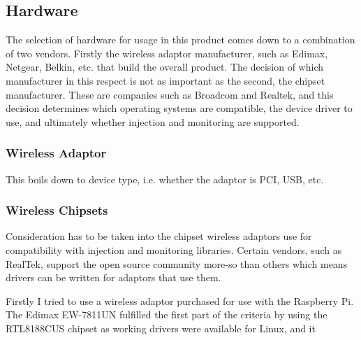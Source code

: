 \subsection{Hardware}
The selection of hardware for usage in this product comes down to a combination of two vendors. Firstly the wireless adaptor manufacturer, such as Edimax, Netgear, Belkin, etc. that build the overall product. The decision of which manufacturer in this respect is not as important as the second, the chipset manufacturer.  These are companies such as Broadcom and Realtek, and this decision determines which operating systems are compatible, the device driver to use, and ultimately whether injection and monitoring are supported.

\subsubsection{Wireless Adaptor}
This boils down to device type, i.e. whether the adaptor is PCI, USB, etc.
\subsubsection{Wireless Chipsets}
Consideration has to be taken into the chipset wireless adaptors use for compatibility with injection and monitoring libraries. Certain vendors, such as RealTek, support the open source community more-so than others which means drivers can be written for adaptors that use them.

Firstly I tried to use a wireless adaptor purchased for use with the Raspberry Pi. The Edimax EW-7811UN fulfilled the first part of the criteria by using the RTL8188CUS chipset as working drivers were available for Linux, and it 